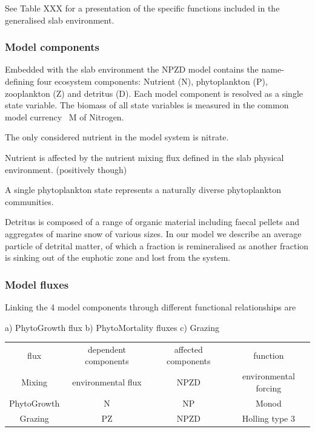 \documentclass[template.tex]{subfiles}
\begin{document}
See Table XXX for a presentation of the specific functions included in the generalised slab environment. 

\subsubsection{Model components}
Embedded with the slab environment the NPZD model contains the name-defining four ecosystem components: Nutrient (N), phytoplankton (P), zooplankton (Z) and detritus (D). 
Each model component is resolved as a single state variable. The biomass of all state variables is measured in the common model currency \unit{\mu M} of Nitrogen.

The only considered nutrient in the model system is nitrate. 

Nutrient is affected by the nutrient mixing flux defined in the slab physical environment. (positively though)



A single phytoplankton state represents a naturally diverse phytoplankton communities. 



Detritus is composed of a range of organic material including faecal pellets and aggregates of marine snow of various sizes. In our model we describe an average particle of detrital matter, of which a fraction is remineralised as another fraction is sinking out of the euphotic zone and lost from the system. 



\subsubsection{Model fluxes} \label{Section:SlabNPZD_Fluxes}
Linking the 4 model components through different functional relationships are 

a) PhytoGrowth flux
b) PhytoMortality fluxes
c) Grazing


\begin{tabular}{c|c|c|c}
flux & dependent components & affected components & function \\
Mixing & environmental flux & NPZD & environmental forcing \\
PhytoGrowth & N & NP & Monod \\
Grazing & PZ & NPZD & Holling type 3\\
\end{tabular}
\end{document}
